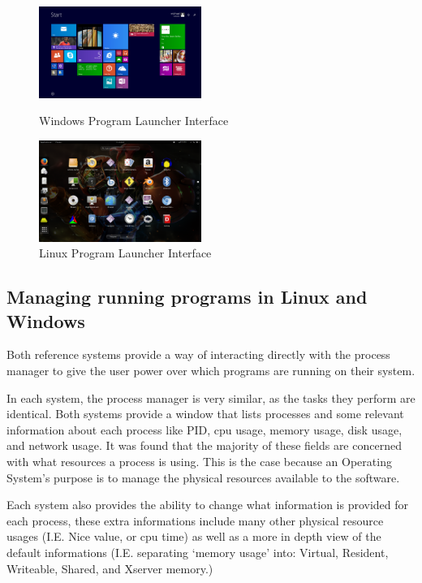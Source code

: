 \documentclass[a4paper]{report}
\begin{document}
\begin{figure}[ht]
\centering
\begin{minipage}{.5\textwidth}
  \centering
  \includegraphics[width=200px]{images/Windows_Program_Launcher_Screenshot}
  \caption{Windows Program Launcher Interface}
  \label{fig:WinLaunchScreen}
\end{minipage}%
\begin{minipage}{.5\textwidth}
  \centering
  \includegraphics[width=200px]{images/Linux_Program_Launcher_Screenshot}
  \caption{Linux Program Launcher Interface}
  \label{fig:LinLaunchScreen}
\end{minipage}
\end{figure}


\subsection{Managing running programs in Linux and Windows}

Both reference systems provide a way of interacting directly with the process manager to give the user power over which programs are running on their system.

In each system, the process manager is very similar, as the tasks they perform are identical. Both systems provide a window that lists processes and some relevant information about each process like PID, cpu usage, memory usage, disk usage, and network usage. It was found that the majority of these fields are concerned with what resources a process is using. This is the case because an Operating System's purpose is to manage the physical resources available to the software.

Each system also provides the ability to change what information is provided for each process, these extra informations include many other physical resource usages (I.E. Nice value, or cpu time) as well as a more in depth view of the default informations (I.E. separating `memory usage' into: Virtual, Resident, Writeable, Shared, and Xserver memory.)
\end{document}
